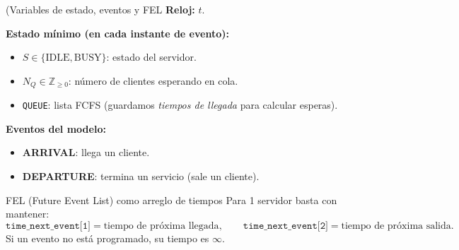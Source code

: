 \documentclass[aspectratio=1610, 9pt]{beamer}
\begin{document}
\begin{frame}{(Variables de estado, eventos y FEL}
\small
\textbf{Reloj:} $t$.

\vspace{3pt}
\textbf{Estado mínimo (en cada instante de evento):}
\begin{itemize}
\item $S \in \{\text{IDLE},\text{BUSY}\}$: estado del servidor.
\item $N_Q \in \mathbb{Z}_{\ge 0}$: número de clientes esperando en cola.
\item \texttt{QUEUE}: lista FCFS (guardamos \emph{tiempos de llegada} para calcular esperas).
\end{itemize}

\vspace{4pt}
\textbf{Eventos del modelo:}
\begin{itemize}
\item \textbf{ARRIVAL}: llega un cliente.
\item \textbf{DEPARTURE}: termina un servicio (sale un cliente).
\end{itemize}

\vspace{6pt}
\begin{block}{FEL (Future Event List) como arreglo de tiempos}
Para 1 servidor basta con mantener:
\[
\texttt{time\_next\_event[1]}=\text{tiempo de próxima llegada},\qquad
\texttt{time\_next\_event[2]}=\text{tiempo de próxima salida}.
\]
Si un evento no está programado, su tiempo es $\infty$.
\end{block}
\end{frame}
\end{document}
